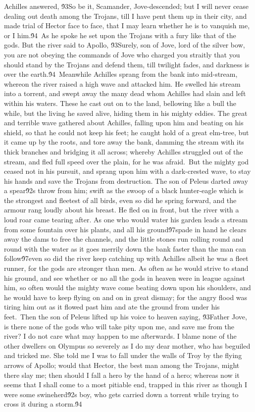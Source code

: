 {Achilles answered, \'93So be it, Scamander, Jove-descended; but I will never cease dealing out death among the Trojans, till I have pent them up in their city, and made trial of Hector face to face, that I may learn whether he is to vanquish me, or I him.\'94\
As he spoke he set upon the Trojans with a fury like that of the gods. But the river said to Apollo, \'93Surely, son of Jove, lord of the silver bow, you are not obeying the commands of Jove who charged you straitly that you should stand by the Trojans and defend them, till twilight fades, and darkness is over the earth.\'94\
Meanwhile Achilles sprang from the bank into mid-stream, whereon the river raised a high wave and attacked him. He swelled his stream into a torrent, and swept away the many dead whom Achilles had slain and left within his waters. These he cast out on to the land, bellowing like a bull the while, but the living he saved alive, hiding them in his mighty eddies. The great and terrible wave gathered about Achilles, falling upon him and beating on his shield, so that he could not keep his feet; he caught hold of a great elm-tree, but it came up by the roots, and tore away the bank, damming the stream with its thick branches and bridging it all across; whereby Achilles struggled out of the stream, and fled full speed over the plain, for he was afraid.\
But the mighty god ceased not in his pursuit, and sprang upon him with a dark-crested wave, to stay his hands and save the Trojans from destruction. The son of Peleus darted away a spear\'92s throw from him; swift as the swoop of a black hunter-eagle which is the strongest and fleetest of all birds, even so did he spring forward, and the armour rang loudly about his breast. He fled on in front, but the river with a loud roar came tearing after. As one who would water his garden leads a stream from some fountain over his plants, and all his ground\'97spade in hand he clears away the dams to free the channels, and the little stones run rolling round and round with the water as it goes merrily down the bank faster than the man can follow\'97even so did the river keep catching up with Achilles albeit he was a fleet runner, for the gods are stronger than men. As often as he would strive to stand his ground, and see whether or no all the gods in heaven were in league against him, so often would the mighty wave come beating down upon his shoulders, and he would have to keep flying on and on in great dismay; for the angry flood was tiring him out as it flowed past him and ate the ground from under his feet.\
Then the son of Peleus lifted up his voice to heaven saying, \'93Father Jove, is there none of the gods who will take pity upon me, and save me from the river? I do not care what may happen to me afterwards. I blame none of the other dwellers on Olympus so severely as I do my dear mother, who has beguiled and tricked me. She told me I was to fall under the walls of Troy by the flying arrows of Apollo; would that Hector, the best man among the Trojans, might there slay me; then should I fall a hero by the hand of a hero; whereas now it seems that I shall come to a most pitiable end, trapped in this river as though I were some swineherd\'92s boy, who gets carried down a torrent while trying to cross it during a storm.\'94\
}
